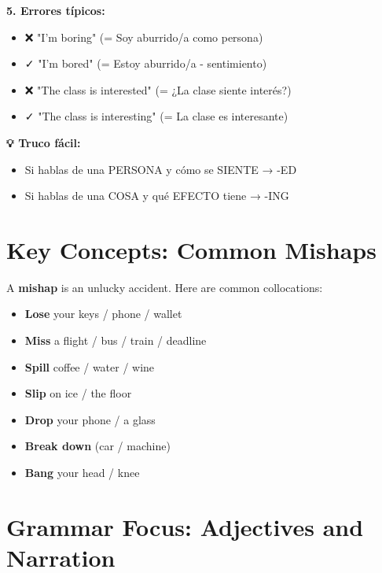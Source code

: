 \begin{comparisonbox}[title=🇪🇸 Adjetivos -ED/-ING: Español NO distingue - Inglés SÍ]
\textbf{5. Errores típicos:}
\begin{itemize}
    \item ❌ "I'm boring" (= Soy aburrido/a como persona)
    \item ✓ "I'm bored" (= Estoy aburrido/a - sentimiento)
    \item ❌ "The class is interested" (= ¿La clase siente interés?)
    \item ✓ "The class is interesting" (= La clase es interesante)
\end{itemize}

\textbf{💡 Truco fácil:}
\begin{itemize}
    \item Si hablas de una PERSONA y cómo se SIENTE → -ED
    \item Si hablas de una COSA y qué EFECTO tiene → -ING
\end{itemize}
\end{comparisonbox}

\section{Key Concepts: Common Mishaps}

A \textbf{mishap} is an unlucky accident. Here are common collocations:

\begin{vocabbox}[title=Mishap Collocations]
\begin{itemize}
    \item \textbf{Lose} your keys / phone / wallet 
    \item \textbf{Miss} a flight / bus / train / deadline 
    \item \textbf{Spill} coffee / water / wine 
    \item \textbf{Slip} on ice / the floor 
    \item \textbf{Drop} your phone / a glass 
    \item \textbf{Break down} (car / machine) 
    \item \textbf{Bang} your head / knee 
\end{itemize}
\end{vocabbox}

\section{Grammar Focus: Adjectives and Narration}

